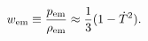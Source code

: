 \begin{equation}
w_{{\rm em}} \equiv \frac{p_{{\rm em}}}{\rho_{{\rm em}}}\approx \frac{1}{3} (1-\dot{T}^2). 
\label{eos1}
\end{equation}

